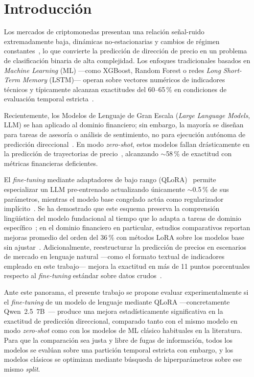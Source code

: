 \documentclass[10pt,twocolumn]{article}
\begin{document}
\section{Introducci\'on}

Los mercados de criptomonedas presentan una relaci\'on se\~nal-ruido extremadamente baja, din\'amicas no-estacionarias y cambios de r\'egimen constantes~\cite{sun2026}, lo que convierte la predicci\'on de direcci\'on de precio en un problema de clasificaci\'on binaria de alta complejidad. Los enfoques tradicionales basados en \textit{Machine Learning} (ML) ---como XGBoost, Random Forest o redes \textit{Long Short-Term Memory} (LSTM)--- operan sobre vectores num\'ericos de indicadores t\'ecnicos y t\'ipicamente alcanzan exactitudes del 60--65\,\% en condiciones de evaluaci\'on temporal estricta~\cite{bysik2026,fu2024}.

Recientemente, los Modelos de Lenguaje de Gran Escala (\textit{Large Language Models}, LLM) se han aplicado al dominio financiero; sin embargo, la mayor\'ia se dise\~nan para tareas de asesor\'ia o an\'alisis de sentimiento, no para ejecuci\'on aut\'onoma de predicci\'on direccional~\cite{nguyen2026}. En modo \textit{zero-shot}, estos modelos fallan dr\'asticamente en la predicci\'on de trayectorias de precio~\cite{liu2026}, alcanzando $\sim$58\,\% de exactitud con m\'etricas financieras deficientes.

El \textit{fine-tuning} mediante adaptadores de bajo rango (QLoRA)~\cite{dettmers2023} permite especializar un LLM pre-entrenado actualizando \'unicamente $\sim$0.5\,\% de sus par\'ametros, mientras el modelo base congelado act\'ua como regularizador impl\'icito~\cite{hu2021}. Se ha demostrado que este esquema preserva la comprensi\'on ling\"u\'istica del modelo fundacional al tiempo que lo adapta a tareas de dominio espec\'ifico~\cite{nimmaturi2025}; en el dominio financiero en particular, estudios comparativos reportan mejoras promedio del orden del 36\,\% con m\'etodos LoRA sobre los modelos base sin ajustar~\cite{wang2025finlora}. Adicionalmente, reestructurar la predicci\'on de precios en escenarios de mercado en lenguaje natural ---como el formato textual de indicadores empleado en este trabajo--- mejora la exactitud en m\'as de 11 puntos porcentuales respecto al \textit{fine-tuning} est\'andar sobre datos crudos~\cite{pan2026}.

Ante este panorama, el presente trabajo se propone evaluar experimentalmente si el \textit{fine-tuning} de un modelo de lenguaje mediante QLoRA ---concretamente Qwen~2.5~7B~\cite{qwen2024}--- produce una mejora estad\'isticamente significativa en la exactitud de predicci\'on direccional, comparado tanto con el mismo modelo en modo \textit{zero-shot} como con los modelos de ML cl\'asico habituales en la literatura. Para que la comparaci\'on sea justa y libre de fugas de informaci\'on, todos los modelos se eval\'uan sobre una partici\'on temporal estricta con embargo, y los modelos cl\'asicos se optimizan mediante b\'usqueda de hiperpar\'ametros sobre ese mismo \textit{split}.
\end{document}
